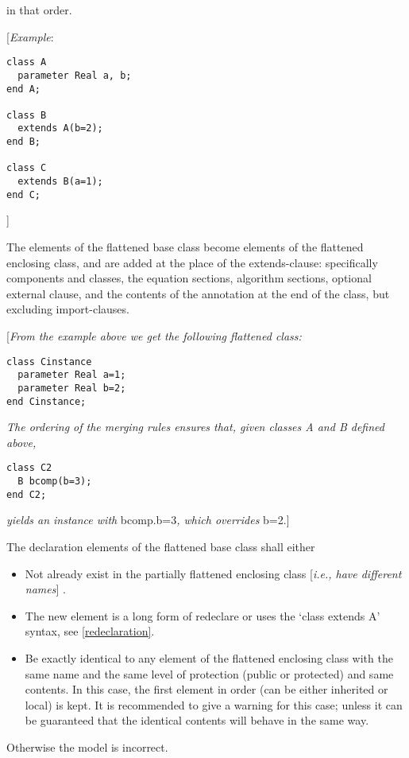 in that order.

{[}\emph{Example}:
\begin{lstlisting}[language=modelica]
class A
  parameter Real a, b;
end A;

class B
  extends A(b=2);
end B;

class C
  extends B(a=1);
end C;
\end{lstlisting}
{]}

The elements of the flattened base class become elements of the
flattened enclosing class, and are added at the place of the
extends-clause: specifically components and classes, the equation
sections, algorithm sections, optional external clause, and the contents
of the annotation at the end of the class, but excluding import-clauses.

{[}\emph{From the example above we get the following flattened class:}
\begin{lstlisting}[language=modelica]
class Cinstance
  parameter Real a=1;
  parameter Real b=2;
end Cinstance;
\end{lstlisting}

\emph{The ordering of the merging rules ensures that, given classes A
and B defined above, }
\begin{lstlisting}[language=modelica]
class C2
  B bcomp(b=3);
end C2;
\end{lstlisting}

\emph{yields an instance with} bcomp.b=3\emph{, which overrides} b=2.{]}

The declaration elements of the flattened base class shall either

\begin{itemize}
\item
  Not already exist in the partially flattened enclosing class
  {[}\emph{i.e., have different names}{]} .
\item
  The new element is a long form of redeclare or uses the `class extends
  A' syntax, see \ref{redeclaration}.
\item
  Be exactly identical to any element of the flattened enclosing class
  with the same name and the same level of protection (public or
  protected) and same contents. In this case, the first element in order
  (can be either inherited or local) is kept. It is recommended to give
  a warning for this case; unless it can be guaranteed that the
  identical contents will behave in the same way.
\end{itemize}

Otherwise the model is incorrect.

